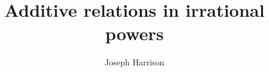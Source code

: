 \documentclass[9pt]{amsart}
\theoremstyle{my_theorem_style}
\numberwithin{definition}{section}
\begin{document}

\title{Additive relations in irrational powers}
\author{Joseph Harrison}
\address{Mathematics Institute, University of Warwick, Coventry, UK}



\end{document}
